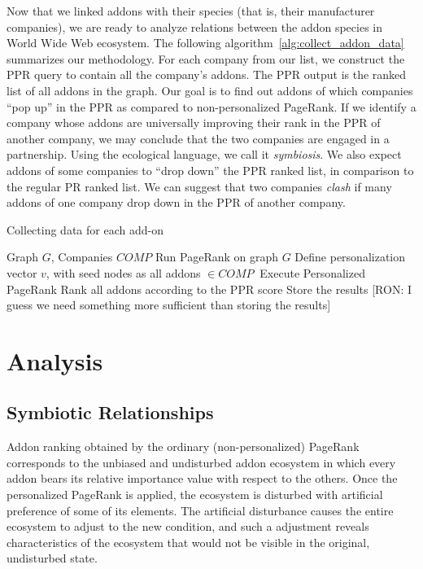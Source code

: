\documentclass[11pt,oneside]{book}
\let\Oldsection\section
\renewcommand{\section}{\FloatBarrier\Oldsection}
\let\Oldsubsection\subsection
\renewcommand{\subsection}{\FloatBarrier\Oldsubsection}
\begin{document}
Now that we linked addons with their species (that is, their manufacturer companies), we are ready to analyze relations between the addon species in World Wide Web ecosystem. The following algorithm~\autoref{alg:collect_addon_data} summarizes our methodology. 
For each company from our list, we construct the PPR query to contain all the company's addons. The PPR output is the ranked list of all addons in the graph. Our goal is to find out addons of which companies ``pop up'' in the PPR as compared to non-personalized PageRank. If we identify a company whose addons are universally improving their rank in the PPR of another company, we may conclude that the two companies are engaged in a partnership. Using the ecological language, we call it \emph{symbiosis}. We also expect addons of some companies to ``drop down'' the PPR ranked list, in comparison to the regular PR ranked list. We can suggest that two companies \emph{clash} if many addons of one company drop down in the PPR of another company.

\begin{algorithm}[!t]
\caption{Collecting data for each add-on}
\label{alg:collect_addon_data}
\begin{algorithmic}[1] 
\REQUIRE Graph $G$, Companies $COMP$
\STATE Run PageRank on graph $G$
\STATE Define personalization vector $v$, with seed nodes as all addons $\in COMP\ $
\STATE Execute Personalized PageRank
\STATE Rank all addons according to the PPR score
\STATE Store the results [RON: I guess we need something more sufficient than storing the results]
\ENDFOR
\end{algorithmic}
\end{algorithm}

\section{Analysis}
\subsection{Symbiotic Relationships}
\label{sec:symb_relations}

Addon ranking obtained by the ordinary (non-personalized) PageRank corresponds to the unbiased and undisturbed addon ecosystem in which every addon bears its relative importance value with respect to the others. Once the personalized PageRank is applied, the ecosystem is disturbed with artificial preference of some of its elements. The artificial disturbance causes the entire ecosystem to adjust to the new condition, and such a adjustment reveals characteristics of the ecosystem that would not be visible in the original, undisturbed state. 
\end{document}
